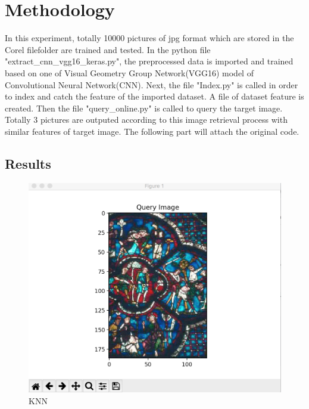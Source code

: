 \documentclass[12pt]{report}
\begin{document}
\chapter{Methodology}

In this experiment, totally 10000 pictures of jpg format which are stored in the Corel filefolder are trained and tested. In the python file "extract\_cnn\_vgg16\_keras.py", the preprocessed data is imported and trained based on one of Visual Geometry Group Network(VGG16) model of Convolutional Neural Network(CNN). Next, the file "Index.py" is called in order to index and catch the feature of the imported dataset. A file of dataset feature is created. Then the file "query\_online.py" is called to query the target image. Totally 3 pictures are outputed according to this image retrieval process with similar features of target image. The following part will attach the original code.


\section{Results}
\begin{figure}[htpb]  
\centering    
\includegraphics[width=\linewidth]{Stream1}
\caption{KNN}\label{1}  
\end{figure} 
\end{document}

